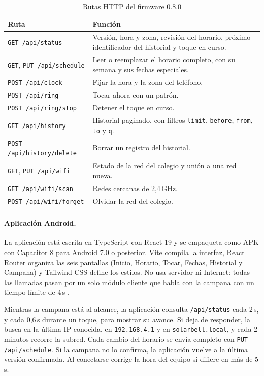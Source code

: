 \documentclass[a4paper,11pt]{article}
\newcommand{\senal}[1]{\texttt{#1}}
\begin{document}
\begin{table}[H]
\centering\small
\caption{Rutas HTTP del firmware 0.8.0}
\label{tab:api}
\begin{tabularx}{\linewidth}{@{}P{4.6cm}Y@{}}
\toprule
\textbf{Ruta} & \textbf{Función} \\
\midrule
\senal{GET /api/status} & Versión, hora y zona, revisión del horario, próximo identificador del historial y toque en curso. \\
\senal{GET}, \senal{PUT /api/schedule} & Leer o reemplazar el horario completo, con su semana y sus fechas especiales. \\
\senal{POST /api/clock} & Fijar la hora y la zona del teléfono. \\
\senal{POST /api/ring} & Tocar ahora con un patrón. \\
\senal{POST /api/ring/stop} & Detener el toque en curso. \\
\senal{GET /api/history} & Historial paginado, con filtros \senal{limit}, \senal{before}, \senal{from}, \senal{to} y \senal{q}. \\
\senal{POST /api/history/delete} & Borrar un registro del historial. \\
\senal{GET}, \senal{PUT /api/wifi} & Estado de la red del colegio y unión a una red nueva. \\
\senal{GET /api/wifi/scan} & Redes cercanas de 2,4\,GHz. \\
\senal{POST /api/wifi/forget} & Olvidar la red del colegio. \\
\bottomrule
\end{tabularx}
\end{table}

\paragraph{Aplicación Android.}
La aplicación está escrita en TypeScript con React 19 y se empaqueta como APK con Capacitor 8 para Android 7.0 o posterior. Vite compila la interfaz, React Router organiza las seis pantallas (Inicio, Horario, Tocar, Fechas, Historial y Campana) y Tailwind CSS define los estilos. No usa servidor ni Internet: todas las llamadas pasan por un solo módulo cliente que habla con la campana con un tiempo límite de 4\,s \cite{repo}.

Mientras la campana está al alcance, la aplicación consulta \senal{/api/status} cada 2\,s, y cada 0,6\,s durante un toque, para mostrar su avance. Si deja de responder, la busca en la última IP conocida, en \senal{192.168.4.1} y en \senal{solarbell.local}, y cada 2 minutos recorre la subred. Cada cambio del horario se envía completo con \senal{PUT /api/schedule}. Si la campana no lo confirma, la aplicación vuelve a la última versión confirmada. Al conectarse corrige la hora del equipo si difiere en más de 5\,s.
\end{document}
